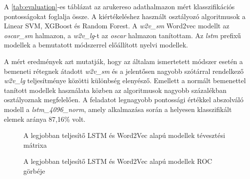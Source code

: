 A \ref{tab:evaluation}-es táblázat az arukereso adathalmazon mért klasszifikációs pontosságokat foglalja össze. A kiértékeléshez használt osztályozó algoritmusok a Linear SVM, XGBoost és Random Forest. A \textit{w2v\_sm} Word2vec modellt az \textit{oscar\_sm} halmazon, a \textit{w2v\_lg}-t az \textit{oscar} halmazon tanítottam. Az \textit{lstm} prefixű modellek a bemutatott módszerrel előállított nyelvi modellek.

A mért eredmények azt mutatják, hogy az általam ismertetett módszer esetén a bemeneti rétegnek átadott \textit{w2v\_sm} és a jelentősen nagyobb szótárral rendelkező \textit{w2v\_lg} teljesítménye közötti különbség elenyésző. Emellett a normált bemenettel tanított modellek használata közben az algoritmusok nagyobb százalékban osztályoznak megfelelően. A feladatot legnagyobb pontossági értékkel abszolváló modell a \textit{lstm\_4096\_norm}, amely alkalmazása során a helyesen klasszifikált elemek aránya 87,16\% volt.

\begin{figure}[H]
	\centering
	\caption{A legjobban teljesítő LSTM és Word2Vec alapú modellek tévesztési mátrixa}
	\label{fig:matrix}
\end{figure}

\begin{figure}[H]
	\centering
	\caption{A legjobban teljesítő LSTM és Word2Vec alapú modellek ROC görbéje}
	\label{fig:roc}
\end{figure}













